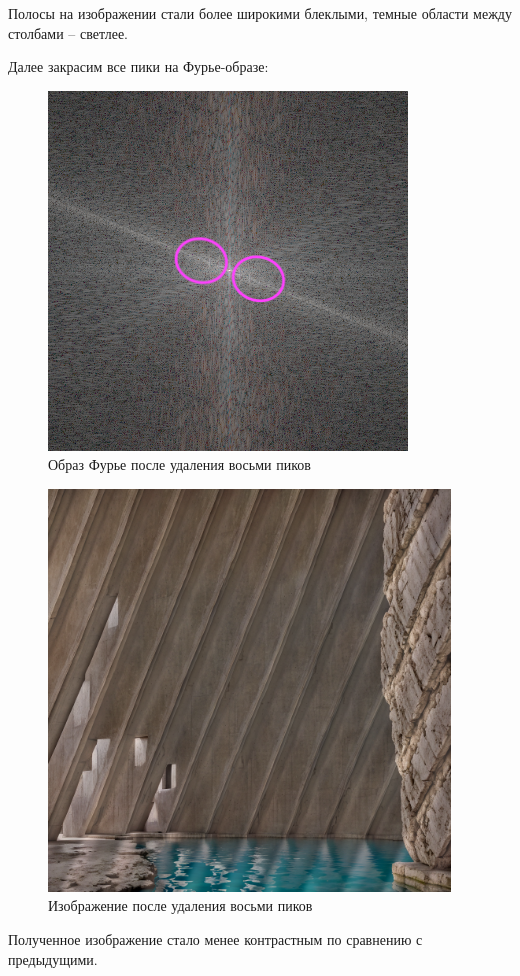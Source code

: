 Полосы на изображении стали более широкими блеклыми, темные области между столбами -- светлее. 

Далее закрасим все пики на Фурье-образе:

\begin{figure}[ht!]
    \centering
    \includegraphics[width=\textwidth]{images/result/task_1/Fourier_8_modified_3_peaks.png}
    \caption{Образ Фурье после удаления восьми пиков}
    \label{fig:image_8_m3}
\end{figure}
\clearpage
\begin{figure}[ht!]
    \centering
    \includegraphics[width=0.95\textwidth]{images/result/task_1/result_8_3.png}
    \caption{Изображение после удаления восьми пиков}
    \label{fig:photo_8_m3}
\end{figure}
Полученное изображение стало менее контрастным по сравнению с предыдущими. 

